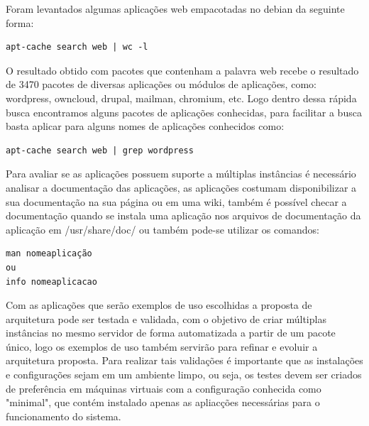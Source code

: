 Foram levantados algumas aplicações web empacotadas no debian da seguinte forma:

\begin{verbatim}
apt-cache search web | wc -l
\end{verbatim}

O resultado obtido com pacotes que contenham a palavra web recebe o resultado de 3470
pacotes de diversas aplicações ou módulos de aplicações, como:
wordpress, owncloud, drupal, mailman, chromium, etc. Logo dentro dessa rápida busca
encontramos alguns pacotes de aplicações conhecidas, para facilitar a busca basta
aplicar para alguns nomes de aplicações conhecidos como:

\begin{verbatim}
apt-cache search web | grep wordpress
\end{verbatim}

Para avaliar se as aplicações possuem suporte a múltiplas instâncias é necessário
analisar a documentação das aplicações, as aplicações costumam disponibilizar a sua
documentação na sua página ou em uma wiki, também é possível checar a documentação
quando se instala uma aplicação nos arquivos de documentação da aplicação em
/usr/share/doc/ ou também pode-se utilizar os comandos:

\begin{verbatim}
man nomeaplicação
ou
info nomeaplicacao
\end{verbatim}

Com as aplicações que serão exemplos de uso escolhidas a proposta de arquitetura
pode ser testada e validada, com o objetivo de criar múltiplas instâncias
no mesmo servidor de forma automatizada a partir de um pacote único, logo os
exemplos de uso também servirão para refinar e evoluir a arquitetura proposta.
Para realizar tais validações é importante que as instalações e configurações
sejam em um ambiente limpo, ou seja, os testes devem ser criados de preferência
em máquinas virtuais com a configuração conhecida como "minimal", que contém
instalado apenas as apliacções necessárias para o funcionamento do sistema.


